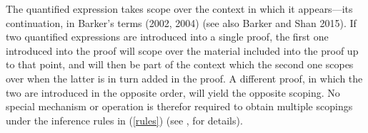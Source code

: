 \documentclass[output=paper,colorlinks,citecolor=brown]{langscibook}
\begin{document}
\begin{exe}
 \ex\label{someoneProof}
\end{exe}
The quantified expression takes scope over the context in which it
appears---its continuation, in Barker's terms (2002,
2004)\nocite{Barker2002}\nocite{Barker2004} (see also Barker and Shan
2015)\nocite{barkershan2015}. If two quantified expressions are
introduced into a single proof, the first one introduced into the
proof will scope over the material included into the proof up to that
point, and will then be part of the context which the second one
scopes over when the latter is in turn added in the proof. A different
proof, in which the two are introduced in the opposite order, will
yield the opposite scoping. No special mechanism or operation is
therefor required to obtain multiple scopings under the inference
rules in (\ref{rules}) (see \citet{kubotalevineBook},  for
details).
\end{document}
